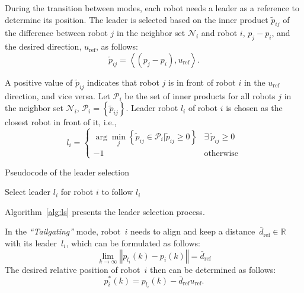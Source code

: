 During the transition between modes, each robot needs a leader as a reference to determine its position. The leader is selected based on the inner product $\tilde{p}_{ij}$ of the difference between robot $j$ in the neighbor set $\mathcal{N}_i$ and robot $i$, $p_j-p_i$, and the desired direction, $u_\text{ref}$, as follows:
\begin{equation}
    \tilde{p}_{ij} = \left\langle (p_j-p_i),u_\text{ref}\right\rangle.
    \label{eqn:tildep}
\end{equation}

A positive value of $\tilde{p}_{ij}$ indicates that robot $j$ is in front of robot $i$ in the $u_\text{ref}$ direction, and vice versa. Let $\mathcal{P}_i$ be the set of inner products for all robots $j$ in the neighbor set $\mathcal{N}_i$, $\mathcal{P}_i=\left\{\tilde{p}_{ij}\right\}$. Leader robot ${l_i}$ of robot $i$ is chosen as the closest robot in front of it, i.e.,
\begin{equation}
     l_i=\begin{cases}
    \arg\min_{j}\left\{\tilde{p}_{ij}\in\mathcal{P}_i\vert\tilde{p}_{ij}\geq0\right\} & \exists~\tilde{p}_{ij}\geq0\\ 
    -1 & \text{otherwise}
     \end{cases}
    \label{eqn:li}
\end{equation}

\begin{algorithm}
\caption{Pseudocode of the leader selection}
\label{alg:ls}
Select leader $l_i$ for robot $i$ to follow
\Return $l_i$\;
\end{algorithm}

Algorithm~\ref{alg:ls} presents the leader selection process. 

In the \textit{``Tailgating''} mode, robot~$i$ needs to align and keep a distance~$\bar{d}_\text{ref}\in\mathbb{R}$ with its leader~$l_i$, which can be formulated as follows:
\begin{equation}
    \lim_{k\to\infty}{\left\Vert p_{l_i}(k)-p_i(k)\right\Vert}=\bar{d}_\text{ref}
    \label{eqn:tailcon}
\end{equation}
The desired relative position of robot~$i$ then can be determined as follows:
\begin{equation}
    p_i^*(k)= p_{l_i}(k)-\bar{d}_\text{ref}u_\text{ref}.
    \label{eqn:tailgating}
\end{equation}

